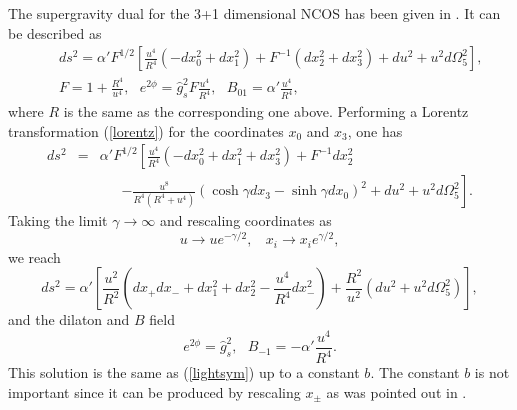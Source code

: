 \documentclass[a4paper,12pt]{article}
\begin{document}
The supergravity dual for the 3+1 dimensional NCOS has been given
in \cite{Gopa1}. It can be described as
\begin{eqnarray}
&& ds^2 = \alpha' F^{1/2}\left [ \frac{u^4}{R^4}\left (-dx_0^2 +dx_1^2 \right )
  +F^{-1}\left (dx_2^2 +dx_3^2\right ) +du^2 +u^2 d\Omega^2_5 \right ],
 \nonumber \\
 && F=1+\frac{R^4}{u^4},\ \ \ e^{2\phi}= \hat{g}_s^2 F \frac{u^4}{R^4}, \ \ \
 B_{01}=\alpha' \frac{u^4}{R^4},
\end{eqnarray}
where $R$ is the same as the corresponding one above.
Performing a Lorentz transformation (\ref{lorentz}) for the coordinates
$x_0$ and $x_3$, one has
\begin{eqnarray}
 ds^2 &=& \alpha' F^{1/2}\left [ \frac{u^4}{R^4}\left (-dx_0^2 +dx_1^2 +
 dx_3^2\right) + F^{-1}dx_2^2 \right. \nonumber \\
 && ~~~~~~~ \left. -\frac{u^8}{R^4(R^4+u^4)}
 \left(\cosh \gamma dx_3 -\sinh\gamma dx_0 \right )^2
 + du^2 + u^2 d\Omega_5^2 \right ].
\end{eqnarray}
Taking the limit $\gamma \to \infty$ and rescaling coordinates as
\begin{equation}
\label{u}
u \to u e^{-\gamma /2}, \ \ \ \ x_i \to x_i e^{\gamma/2},
\end{equation}
we reach
\begin{equation}
ds^2 =\alpha' \left [\frac{u^2}{R^2}\left (dx_+dx_- + dx_1^2 +dx_2^2
 -\frac{u^4}{R^4}dx_-^2\right ) +
 \frac{R^2}{u^2}\left (du^2 +u^2 d\Omega_5^2\right )\right ],
\end{equation}
and the dilaton and $B$ field
\begin{equation}
e^{2\phi}=\hat{g}_s^2, \ \ \ B_{-1}=-\alpha'\frac{u^4}{R^4}.
\end{equation}
This solution is the same as (\ref{lightsym}) up to a constant $b$.
The constant $b$ is not important since it can be produced by
rescaling $x_{\pm}$ as was pointed out in \cite{AOR}.
\end{document}
